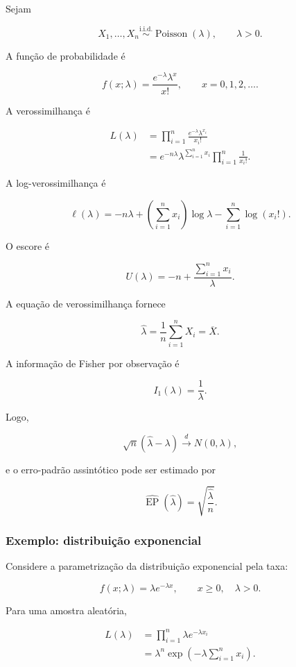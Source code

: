 \documentclass[
  letterpaper,
  DIV=11,
  numbers=noendperiod]{scrreprt}
\begin{document}
Sejam

\[X_1,\ldots,X_n
\overset{\mathrm{i.i.d.}}{\sim}
\operatorname{Poisson}(\lambda),
\qquad \lambda>0.\]

A função de probabilidade é

\[f(x;\lambda)
=
\frac{e^{-\lambda}\lambda^x}{x!},
\qquad x=0,1,2,\ldots.\]

A verossimilhança é

\[\begin{aligned}
L(\lambda)
&=
\prod_{i=1}^n
\frac{
e^{-\lambda}\lambda^{x_i}
}{
x_i!
}\\
&=
e^{-n\lambda}
\lambda^{\sum_{i=1}^n x_i}
\prod_{i=1}^n
\frac{1}{x_i!}.
\end{aligned}\]

A log-verossimilhança é

\[\ell(\lambda)
=
-n\lambda
+
\left(
\sum_{i=1}^n x_i
\right)
\log\lambda
-
\sum_{i=1}^n
\log(x_i!).\]

O escore é

\[U(\lambda)
=
-n
+
\frac{
\sum_{i=1}^n x_i
}{
\lambda
}.\]

A equação de verossimilhança fornece

\[\widehat\lambda
=
\frac{1}{n}
\sum_{i=1}^n X_i
=
\overline X.\]

A informação de Fisher por observação é

\[I_1(\lambda)
=
\frac{1}{\lambda}.\]

Logo,

\[\sqrt n
(\widehat\lambda-\lambda)
\xrightarrow{d}
N(0,\lambda),\]

e o erro-padrão assintótico pode ser estimado por

\[\widehat{\operatorname{EP}}
(\widehat\lambda)
=
\sqrt{
\frac{\widehat\lambda}{n}
}.\]

\subsubsection{Exemplo: distribuição
exponencial}\label{exemplo-distribuiuxe7uxe3o-exponencial-1}

Considere a parametrização da distribuição exponencial pela taxa:

\[f(x;\lambda)
=
\lambda e^{-\lambda x},
\qquad x\geq 0,\quad\lambda>0.\]

Para uma amostra aleatória,

\[\begin{aligned}
L(\lambda)
&=
\prod_{i=1}^n
\lambda e^{-\lambda x_i}\\
&=
\lambda^n
\exp
\left(
-\lambda
\sum_{i=1}^n x_i
\right).
\end{aligned}\]
\end{document}
